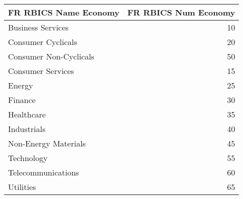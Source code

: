 \begin{tabular}{lr}
\hline
 FR RBICS Name Economy   &   FR RBICS Num Economy \\
\hline
 Business Services       &                     10 \\
 Consumer Cyclicals      &                     20 \\
 Consumer Non-Cyclicals  &                     50 \\
 Consumer Services       &                     15 \\
 Energy                  &                     25 \\
 Finance                 &                     30 \\
 Healthcare              &                     35 \\
 Industrials             &                     40 \\
 Non-Energy Materials    &                     45 \\
 Technology              &                     55 \\
 Telecommunications      &                     60 \\
 Utilities               &                     65 \\
\hline
\end{tabular}